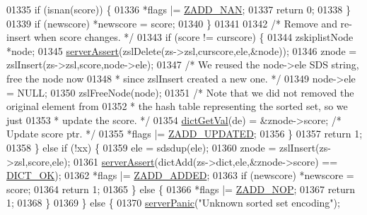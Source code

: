 \begin{DoxyCode}
01335                 \textcolor{keywordflow}{if} (isnan(score)) \{
01336                     *flags |= \hyperlink{server_8h_ae46720414ddb69ab95bbade04b15194c}{ZADD\_NAN};
01337                     \textcolor{keywordflow}{return} 0;
01338                 \}
01339                 \textcolor{keywordflow}{if} (newscore) *newscore = score;
01340             \}
01341 
01342             \textcolor{comment}{/* Remove and re-insert when score changes. */}
01343             \textcolor{keywordflow}{if} (score != curscore) \{
01344                 zskiplistNode *node;
01345                 \hyperlink{server_8h_a88114b5169b4c382df6b56506285e56a}{serverAssert}(zslDelete(zs->zsl,curscore,ele,&node));
01346                 znode = zslInsert(zs->zsl,score,node->ele);
01347                 \textcolor{comment}{/* We reused the node->ele SDS string, free the node now}
01348 \textcolor{comment}{                 * since zslInsert created a new one. */}
01349                 node->ele = NULL;
01350                 zslFreeNode(node);
01351                 \textcolor{comment}{/* Note that we did not removed the original element from}
01352 \textcolor{comment}{                 * the hash table representing the sorted set, so we just}
01353 \textcolor{comment}{                 * update the score. */}
01354                 \hyperlink{dict_8h_ae8d2cc391873b2bea2b87c4f80f43120}{dictGetVal}(de) = &znode->score; \textcolor{comment}{/* Update score ptr. */}
01355                 *flags |= \hyperlink{server_8h_aabb6bb7a2a2e73ab9fcda97cf704761b}{ZADD\_UPDATED};
01356             \}
01357             \textcolor{keywordflow}{return} 1;
01358         \} \textcolor{keywordflow}{else} \textcolor{keywordflow}{if} (!xx) \{
01359             ele = sdsdup(ele);
01360             znode = zslInsert(zs->zsl,score,ele);
01361             \hyperlink{server_8h_a88114b5169b4c382df6b56506285e56a}{serverAssert}(dictAdd(zs->dict,ele,&znode->score) == 
      \hyperlink{dict_8h_a2afecbeab8f7efbc183048f52f6d17e5}{DICT\_OK});
01362             *flags |= \hyperlink{server_8h_a2c0f3e2c3a5c73496b732648c69eda18}{ZADD\_ADDED};
01363             \textcolor{keywordflow}{if} (newscore) *newscore = score;
01364             \textcolor{keywordflow}{return} 1;
01365         \} \textcolor{keywordflow}{else} \{
01366             *flags |= \hyperlink{server_8h_afd0096ac4bedddb9b0b7f27396839c06}{ZADD\_NOP};
01367             \textcolor{keywordflow}{return} 1;
01368         \}
01369     \} \textcolor{keywordflow}{else} \{
01370         \hyperlink{server_8h_a11cc378e7778a830b41240578de3b204}{serverPanic}(\textcolor{stringliteral}{"Unknown sorted set encoding"});

\end{DoxyCode}

